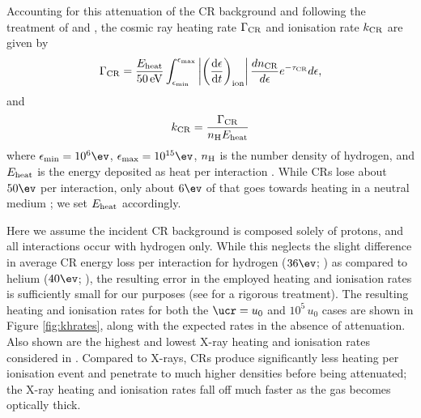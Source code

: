 Accounting for this attenuation of the CR background and following the treatment of \citet{StacyBromm2007} and \citet{InayoshiOmukai2011}, the cosmic ray heating rate $\Gamma_{\rm \small CR}$ and ionisation rate $k_{\rm \small CR}$ are given by
\begin{equation}
\Gamma_{\rm \small CR} = 
    \frac{ E_{\rm \small heat}}{50\,{\rm \small eV}} 
    \int_{\epsilon_{\rm min}}^{\epsilon_{\rm max}} 
    \left| \left( \frac{{\rm d}\epsilon} {{\rm d}t} \right)_{\rm ion} \right|
    \frac{dn_{\rm \tiny CR}}{d\epsilon} e^{-\tau_{\rm \small CR}} d\epsilon,
\end{equation}
and 
\begin{equation}
k_{\rm \small CR} = \frac{\Gamma_{\rm \small CR}}{ n_{\rm \small H} E_{\rm \small heat}}
\end{equation}
where $\epsilon_{\rm min} = 10^6\ev$, $\epsilon_{\rm max}= 10^{15}\ev$, $n_{\rm \small H}$ is the number density of hydrogen, and $E_{\rm \small heat}$ is the energy deposited as heat per interaction \citep{Schlickeiser2002}.
While CRs lose about $50\ev$ per interaction, only about $6\ev$ of that goes towards heating in a neutral medium \citep{SpitzerScott1969,ShullvanSteenberg1985}; we set $E_{\rm \small heat}$ accordingly.

Here we assume the incident CR background is composed solely of protons, and all interactions occur with hydrogen only.  
While this neglects the slight difference in average CR energy loss per interaction for hydrogen ($36\ev$; \citealt{BakkerSegre1951}) as compared to helium ($40\ev$; \citealt{WeissBernstein1956}), the resulting error in the employed heating and ionisation rates is sufficiently small for our purposes (see \citet{JascheCiardiEnsslin2007} for a rigorous treatment). 
The resulting heating and ionisation rates for both the $\ucr=u_0$ and $10^5\,u_0$ cases are shown in Figure \ref{fig:khrates}, along with the expected rates in the absence of attenuation. Also shown are the highest and lowest X-ray heating and ionisation rates considered in \citet{Hummeletal2015}. Compared to X-rays, CRs produce significantly less heating per ionisation event and penetrate to much higher densities before being attenuated; the X-ray heating and ionisation rates fall off much faster as the gas becomes optically thick.